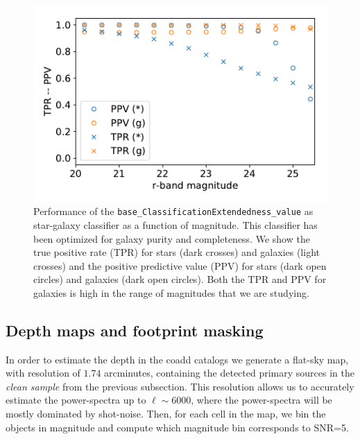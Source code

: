 \documentclass[\docopts]{\docclass}
\begin{document}
\begin{figure}
\centering
\includegraphics[width=0.9\columnwidth]{stellar_contamination_v2}
\caption{Performance of the \texttt{base\_ClassificationExtendedness\_value} as star-galaxy classifier as a function of magnitude. This classifier has been optimized for galaxy purity and completeness. We show the true positive rate (TPR) for stars (dark crosses) and galaxies (light crosses) and the positive predictive value (PPV) for stars (dark open circles) and galaxies (dark open circles). Both the TPR and PPV for galaxies is high in the range of magnitudes that we are studying.}
\label{fig:star_galaxy_separation}
\end{figure}
\subsection{Depth maps and footprint masking}
\label{sec:masking}

In order to estimate the depth in the coadd catalogs we generate a flat-sky map, with resolution of $1.74$ arcminutes, containing the detected primary sources in the \textit{clean sample} from the previous subsection. This resolution allows us to accurately estimate the power-spectra up to $\ell \sim 6000$, where the power-spectra will be mostly dominated by shot-noise. Then, for each cell in the map, we bin the objects in magnitude and compute which magnitude bin corresponds to SNR=5.
\end{document}
